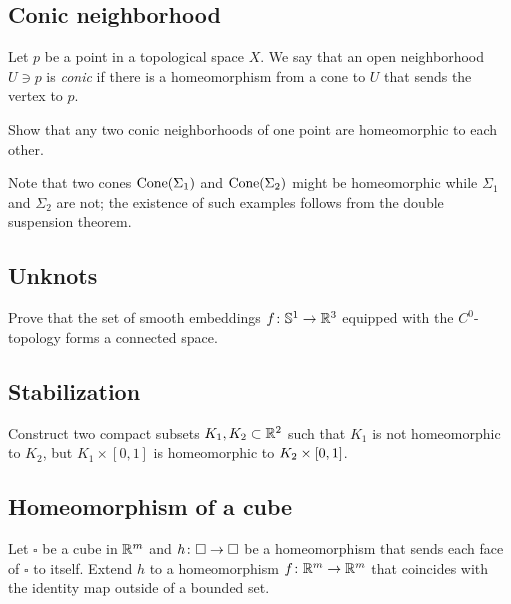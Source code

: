 \subsection*{Conic neighborhood}
\label{Conic neighborhood}

Let $p$ be a point in a topological space $X$.
We say that an open neighborhood $U\ni p$ is \emph{conic}
if there is a homeomorphism from a cone
to $U$ that sends the vertex to $p$.

\begin{pr}  
Show that any two conic neighborhoods of one point are homeomorphic to each other.
\end{pr}

Note that two cones $\mathop{\rm Cone}(\Sigma_1)$ and $\mathop{\rm Cone}(\Sigma_2)$ might be homeomorphic while $\Sigma_1$ and $\Sigma_2$ are not;
the existence of such examples follows from the double suspension theorem.

\subsection*{Unknots\easy}\label{No knots}

\begin{pr}
Prove that the set of smooth embeddings $f\:\mathbb{S}^1\z\to\RR^3$ equipped with the $C^0$-topology 
forms a connected space.
\end{pr}

\subsection*{Stabilization}\label{Simple stabilization}

\begin{pr}
Construct two compact subsets $K_1, K_2\subset\mathbb{R}^2$ such that
$K_1$ is not homeomorphic to $K_2$, but $K_1\times[0,1]$ is homeomorphic to $K_2\z\times[0,1]$.
\end{pr}

\subsection*{Homeomorphism of a cube}\label{Homeomorphism of cube}

\begin{pr}
Let $\square$ be a cube in $\mathbb{R}^m$
and $h\:\square\z\to\square$ be
a homeomorphism that sends each face of $\square$ to itself.
Extend $h$ to a homeomorphism $f\:\RR^m\z\to\RR^m$ that coincides with the identity map outside of a bounded set.    
\end{pr}

